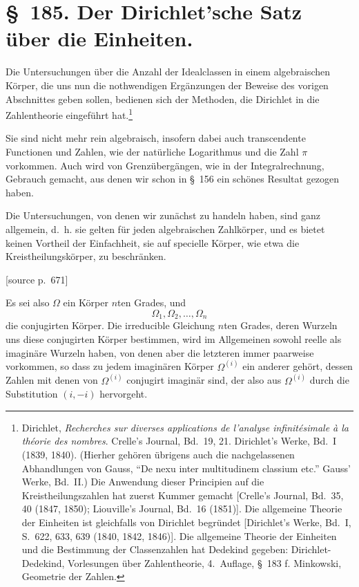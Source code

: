 \documentclass[11pt]{article}
\newcommand{\srcpage}[1]{\par\medskip\noindent\textsf{[source p.~#1]}\par\smallskip}
\begin{document}
\section*{\S~185. Der Dirichlet'sche Satz über die Einheiten.}

Die Untersuchungen über die Anzahl der Idealclassen in einem algebraischen Körper, die uns nun die nothwendigen Ergänzungen der Beweise des vorigen Abschnittes geben sollen, bedienen sich der Methoden, die Dirichlet in die Zahlentheorie eingeführt hat.\footnote{Dirichlet, \textit{Recherches sur diverses applications de l'analyse infinitésimale à la théorie des nombres}. Crelle's Journal, Bd.~19, 21. Dirichlet's Werke, Bd.~I (1839, 1840). (Hierher gehören übrigens auch die nachgelassenen Abhandlungen von Gauss, ``De nexu inter multitudinem classium etc.'' Gauss' Werke, Bd.~II.) Die Anwendung dieser Principien auf die Kreistheilungszahlen hat zuerst Kummer gemacht [Crelle's Journal, Bd.~35, 40 (1847, 1850); Liouville's Journal, Bd.~16 (1851)]. Die allgemeine Theorie der Einheiten ist gleichfalls von Dirichlet begründet [Dirichlet's Werke, Bd.~I, S.~622, 633, 639 (1840, 1842, 1846)]. Die allgemeine Theorie der Einheiten und die Bestimmung der Classenzahlen hat Dedekind gegeben: Dirichlet-Dedekind, Vorlesungen über Zahlentheorie, 4.~Auflage, \S~183 f. Minkowski, Geometrie der Zahlen.}

Sie sind nicht mehr rein algebraisch, insofern dabei auch transcendente Functionen und Zahlen, wie der natürliche Logarithmus und die Zahl $\pi$ vorkommen. Auch wird von Grenzübergängen, wie in der Integralrechnung, Gebrauch gemacht, aus denen wir schon in \S~156 ein schönes Resultat gezogen haben.

Die Untersuchungen, von denen wir zunächst zu handeln haben, sind ganz allgemein, d.~h. sie gelten für jeden algebraischen Zahlkörper, und es bietet keinen Vortheil der Einfachheit, sie auf specielle Körper, wie etwa die Kreistheilungskörper, zu beschränken.

\srcpage{671}
Es sei also $\Omega$ ein Körper $n$ten Grades, und
\begin{equation}
\Omega_1,\Omega_2,\ldots,\Omega_n
\tag{1}
\end{equation}
die conjugirten Körper. Die irreducible Gleichung $n$ten Grades, deren Wurzeln uns diese conjugirten Körper bestimmen, wird im Allgemeinen sowohl reelle als imaginäre Wurzeln haben, von denen aber die letzteren immer paarweise vorkommen, so dass zu jedem imaginären Körper $\Omega^{(i)}$ ein anderer gehört, dessen Zahlen mit denen von $\Omega^{(i)}$ conjugirt imaginär sind, der also aus $\Omega^{(i)}$ durch die Substitution $(i,-i)$ hervorgeht.
\end{document}
